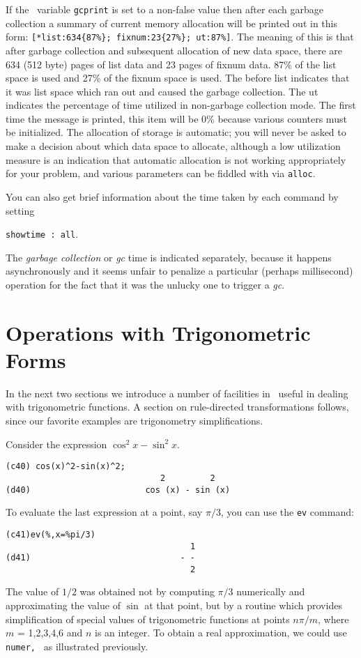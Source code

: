 If the \Max\ variable {\tt  gcprint} is set to a non-false value then
after each garbage collection a summary of current memory allocation
will be printed out in this form: 
{\tt [*list:634\{87\%\}; fixnum:23\{27\%\}; ut:87\%]}.
The meaning of this is that after garbage collection and subsequent
allocation of new data space, there are 634 (512 byte) pages of list data and
23 pages of fixnum data. 87\% of the list space is used and 27\% of the fixnum
space is used.  The {\tt *} before list indicates that it was list space which 
ran out and caused the garbage collection. The ut indicates the percentage
of time utilized in non-garbage collection mode.  The first time the
message is printed, this item will be 0\% because 
various counters must be initialized. The allocation of storage is
automatic; you will never be asked to make a decision about which data
space to allocate, although a low utilization measure is an indication
that automatic allocation is not working appropriately for your problem,
and various parameters can be fiddled with via {\tt alloc}.

You
can also get brief information about the time taken by each command
by setting 
\begin{center}
{\tt  showtime : all}.
\end{center}
The {\it garbage collection} or 
{\it gc} time is indicated separately,
because it happens asynchronously and it seems unfair to penalize a
particular (perhaps millisecond) operation for the fact that it
was the unlucky one to trigger a {\it gc}.


\section{Operations with Trigonometric Forms}

In the next two sections we introduce a number of facilities in \Max\
useful in dealing with trigonometric functions. A section on rule-directed
transformations follows, since our favorite examples are
trigonometry simplifications.

Consider the expression $ \cos^2 x - \sin^2 x $.
\begin{verbatim}
(c40) cos(x)^2-sin(x)^2;
                               2         2 
(d40)                       cos (x) - sin (x)
\end{verbatim}

To evaluate the last expression at a point, say
$\pi / 3 $, you can use the {\tt ev}
command:
\begin{verbatim}
(c41)ev(%,x=%pi/3)
                                     1
(d41)                              - -
                                     2
\end{verbatim}
The value of $1 / 2 $ was obtained not by computing $ \pi / 3 $
numerically and approximating the value of $\sin$ at that point, but
by a routine which provides simplification of special values of
trigonometric functions at points $ n \pi / m $, where 
$m$ = 1,2,3,4,6 and $n$ is an integer.
To obtain a 
real approximation, we could use {\tt numer, }
as illustrated previously.

